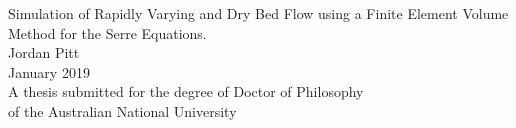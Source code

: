 \begin{titlepage}
\begin{center}

\vspace*{\fill} \Huge
                        Simulation of Rapidly Varying and Dry Bed Flow 
                        using a Finite Element Volume Method for the 
                        Serre Equations.
\\
\vfill\vfill\Large
                          Jordan Pitt
\\
\vfill\vfill
                          January 2019
\\
\vfill\vfill \normalsize
         A thesis submitted for the degree of Doctor of Philosophy\\
         of the Australian National University
\vfill
         \anulogo

\end{center}

\end{titlepage}
